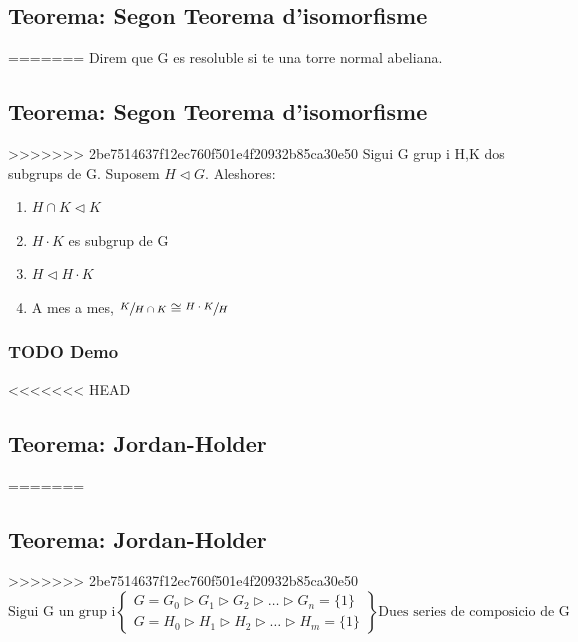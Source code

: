 \documentclass[11pt]{article}
\begin{document}
\subsection{Teorema: Segon Teorema d'isomorfisme}
\label{sec:org4bfa2cb}
=======
\label{sec:org1b385a8}
Direm que G es resoluble si te una torre normal abeliana.

\subsection{Teorema: Segon Teorema d'isomorfisme}
\label{sec:orgdf9145a}
>>>>>>> 2be7514637f12ec760f501e4f20932b85ca30e50
Sigui G grup i H,K dos subgrups de G. Suposem \(H \vartriangleleft G\). Aleshores:
\begin{enumerate}
\item \(H \cap K \vartriangleleft K\)
\item \(H \cdot K\) es subgrup de G
\item \(H \vartriangleleft H \cdot K\)
\item A mes a mes, \(\sfrac{K}{H \cap K} \cong \sfrac{H \cdot K}{H}\)
\end{enumerate}

\subsubsection{{\bfseries\sffamily TODO} Demo}
<<<<<<< HEAD
\label{sec:org572810b}

\subsection{Teorema: Jordan-Holder}
\label{sec:org83d9524}
=======
\label{sec:org172a711}

\subsection{Teorema: Jordan-Holder}
\label{sec:org538576e}
>>>>>>> 2be7514637f12ec760f501e4f20932b85ca30e50
\begin{displaymath}
    \text{Sigui G un grup i}
               \left\{\begin{array}{ll}
G = G_0 \vartriangleright G_1 \vartriangleright G_2 \vartriangleright \ldots \vartriangleright G_n = \{1\} \\
G = H_0 \vartriangleright H_1 \vartriangleright H_2 \vartriangleright \ldots \vartriangleright H_m = \{1\}
                \end{array}
\right\rbrace
              \text{Dues series de composicio de G}
\end{displaymath}
\end{document}
